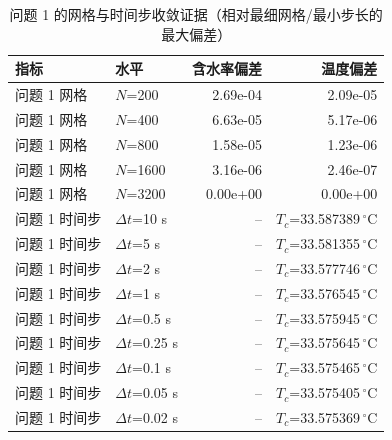 \begin{table}[H]
\centering
\caption{问题 1 的网格与时间步收敛证据（相对最细网格/最小步长的最大偏差）}
\label{tab:conv1}
\footnotesize
\begin{tabular}{@{}llrr@{}}
\toprule
指标 & 水平 & 含水率偏差 & 温度偏差 \\
\midrule
问题 1 网格 & $N$=200 & 2.69e-04 & 2.09e-05 \\
问题 1 网格 & $N$=400 & 6.63e-05 & 5.17e-06 \\
问题 1 网格 & $N$=800 & 1.58e-05 & 1.23e-06 \\
问题 1 网格 & $N$=1600 & 3.16e-06 & 2.46e-07 \\
问题 1 网格 & $N$=3200 & 0.00e+00 & 0.00e+00 \\
问题 1 时间步 & $\Delta t$=10 s & -- & $T_c$=33.587389\,$^\circ$C \\
问题 1 时间步 & $\Delta t$=5 s & -- & $T_c$=33.581355\,$^\circ$C \\
问题 1 时间步 & $\Delta t$=2 s & -- & $T_c$=33.577746\,$^\circ$C \\
问题 1 时间步 & $\Delta t$=1 s & -- & $T_c$=33.576545\,$^\circ$C \\
问题 1 时间步 & $\Delta t$=0.5 s & -- & $T_c$=33.575945\,$^\circ$C \\
问题 1 时间步 & $\Delta t$=0.25 s & -- & $T_c$=33.575645\,$^\circ$C \\
问题 1 时间步 & $\Delta t$=0.1 s & -- & $T_c$=33.575465\,$^\circ$C \\
问题 1 时间步 & $\Delta t$=0.05 s & -- & $T_c$=33.575405\,$^\circ$C \\
问题 1 时间步 & $\Delta t$=0.02 s & -- & $T_c$=33.575369\,$^\circ$C \\
\bottomrule
\end{tabular}
\end{table}
